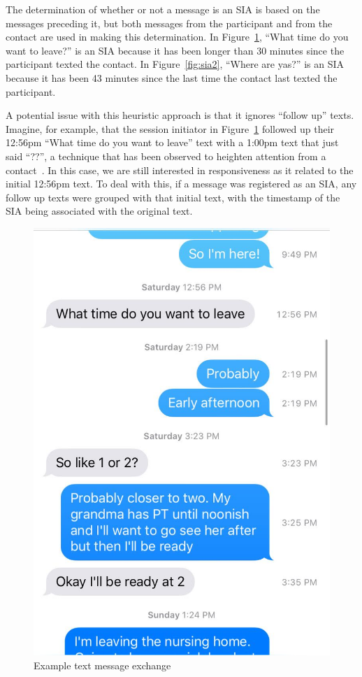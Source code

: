 \documentclass[12pt]{nuthesis}	%
\begin{document}
The determination of whether or not a message is an SIA is based on the messages preceding it, but both messages from the participant and from the contact are used in making this determination. In Figure~\ref{fig:sia}, ``What time do you want to leave?'' is an SIA because it has been longer than 30 minutes since the participant texted the contact. In Figure~\ref{fig:sia2}, ``Where are yas?'' is an SIA because it has been 43 minutes since the last time the contact last texted the participant.

A potential issue with this heuristic approach is that it ignores ``follow up'' texts. Imagine, for example, that the session initiator in Figure~\ref{fig:sia} followed up their 12:56pm ``What time do you want to leave'' text with a 1:00pm text that just said ``??'', a technique that has been observed to heighten attention from a contact~\citep{heston2017worth}. In this case, we are still interested in responsiveness as it related to the initial 12:56pm text. To deal with this, if a message was registered as an SIA, any follow up texts were grouped with that initial text, with the timestamp of the SIA being associated with the original text.

\begin{figure}[h]
\centering
\includegraphics[width=.7\textwidth]{figures/example_sia}
\caption{Example text message exchange}
\label{fig:sia}
\end{figure}
\end{document}
